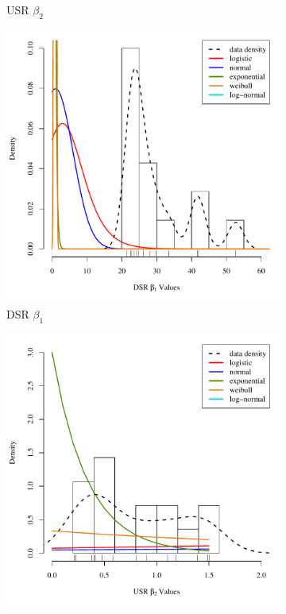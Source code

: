\begin{linenumbers}
\begin{figure}[htbp]
\begin{subfigure}{0.5\textwidth}
	\caption{USR $\beta_2$}
	\label{sub b2}
\end{subfigure}
\begin{subfigure}{0.5\textwidth}
	\centering
	\includegraphics[width=0.9\linewidth]{"Figures/Results_DSR/DSR B1 Dist"}
	\caption{DSR $\beta_1$}
	\label{sub b1}
\end{subfigure}%
\begin{subfigure}{0.5\textwidth}
	\centering
	\includegraphics[width=0.9\linewidth]{"Figures/Results_DSR/DSR B2 Dist"}

\end{subfigure}
\end{figure}
\end{linenumbers}
